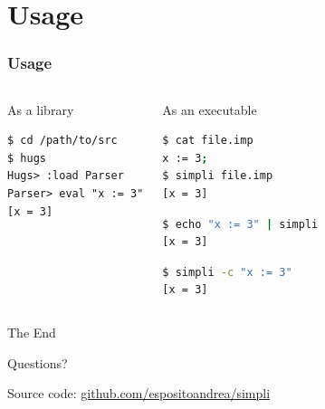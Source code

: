 \documentclass{beamer}
\begin{document}
\section{Usage}
\begin{frame}[fragile]
	\frametitle{Usage}
	\begin{columns}
		\begin{block}{As a library}
\begin{lstlisting}
$ cd /path/to/src
$ hugs
Hugs> :load Parser
Parser> eval "x := 3"
[x = 3]
\end{lstlisting}
			\end{block}
		\begin{block}{As an executable}
\begin{lstlisting}[language=sh]
$ cat file.imp
x := 3;
$ simpli file.imp
[x = 3]
\end{lstlisting}
\begin{lstlisting}[language=sh]
$ echo "x := 3" | simpli
[x = 3]
\end{lstlisting}
\begin{lstlisting}[language=sh]
$ simpli -c "x := 3"
[x = 3]
\end{lstlisting}
		\end{block}
	\end{columns}
\end{frame}

{
	\settocustomtemplate
	\begin{frame}
		\color{white}
		\vfill
		\begin{center}
			\Large
			The End
		\end{center}
		\begin{center}
			\small
			Questions?
		\end{center}
		\vfill
		\begin{center}
			\scriptsize
			Source code:
			\href{https://github.com/espositoandrea/simpli}{%
				\color{mylinkcolor}github.com/espositoandrea/simpli
			}
		\end{center}
	\end{frame}
}
\end{document}
